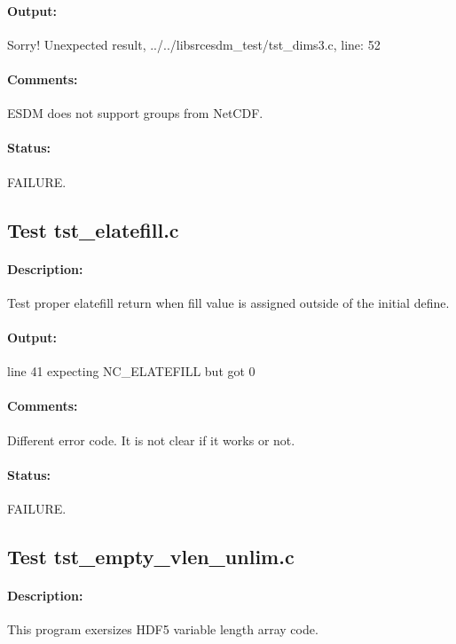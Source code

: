 \paragraph{Output:} Sorry! Unexpected result, ../../libsrcesdm\_test/tst\_dims3.c, line: 52

\paragraph{Comments:} ESDM does not support groups from NetCDF.

\paragraph{Status:} FAILURE.

\subsection{Test tst\_elatefill.c}

\paragraph{Description:} Test proper elatefill return when fill value is assigned outside of the initial define.

\paragraph{Output:} line 41 expecting NC\_ELATEFILL but got 0

\paragraph{Comments:} Different error code. It is not clear if it works or not.

\paragraph{Status:} FAILURE.

\subsection{Test tst\_empty\_vlen\_unlim.c}

\paragraph{Description:} This program exersizes HDF5 variable length array code.

